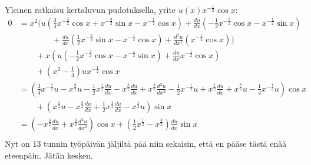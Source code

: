 \documentclass{article}
\begin{document}
Yleinen ratkaisu kertaluvun pudotuksella, yrite $u(x)x^{-\frac{1}{2}}\cos x$:
\begin{align*}
  0 &= x^2(u(\frac{3}{4}x^{-\frac{5}{2}}\cos x + x^{-\frac{3}{2}}\sin x
  - x^{-\frac{1}{2}}\cos x)
  + \frac{du}{dx}(-\frac{1}{2}x^{-\frac{3}{2}}\cos x - x^{-\frac{1}{2}}\sin x) \\
    &\qquad\qquad+ \frac{du}{dx}(\frac{1}{2}x^{-\frac{3}{2}}\sin x - x^{-\frac{1}{2}}\cos x)
    + \frac{d^2 u}{d x^2}(x^{-\frac{1}{2}}\cos x)
  ) \\
    &\qquad+ x(u(-\frac{1}{2}x^{-\frac{3}{2}}\cos x - x^{-\frac{1}{2}}\sin x)
  + \frac{du}{dx} x^{-\frac{1}{2}} \cos x) \\
    &\qquad+ (x^2 - \frac{1}{4})ux^{-\frac{1}{2}}\cos x \\
    &= (\frac{3}{4}x^{-\frac{1}{2}}u - x^{\frac{3}{2}}u - \frac{1}{2}x^{\frac{1}{2}}\frac{du}{dx}
    - x^{\frac{3}{2}}\frac{du}{dx} + x^{\frac{3}{2}}\frac{d^2 u}{d x^2}
    - \frac{1}{2}x^{-\frac{1}{2}}u + x^{\frac{1}{2}}\frac{du}{dx}
    + x^{\frac{3}{2}}u - \frac{1}{4}x^{-\frac{1}{2}}u) \cos x \\
    &\qquad+ (x^{\frac{1}{2}}u - x^{\frac{3}{2}}\frac{du}{dx}
    + \frac{1}{2}x^{\frac{1}{2}}\frac{du}{dx} - x^{\frac{1}{2}}u) \sin x \\
    &= (-x^{\frac{3}{2}}\frac{du}{dx} + x^{\frac{3}{2}}\frac{d^2 u}{d x^2}) \cos x
    + (\frac{1}{2}x^{\frac{1}{2}} - x^{\frac{3}{2}})\frac{du}{dx}\sin x \\
\end{align*}
Nyt on 13 tunnin työpäivän jäljiltä pää niin sekaisin, että en pääse tästä enää eteenpäin.
Jätän kesken.
\end{document}
